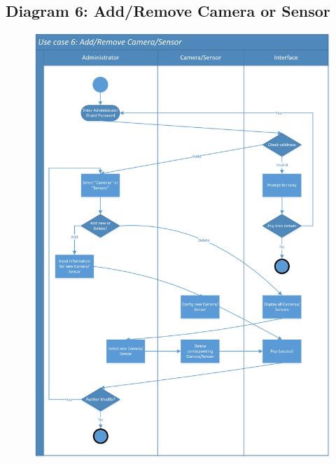 \documentclass[twoside,11pt]{article}
\begin{document}
\subsection{Diagram 6: Add/Remove Camera or Sensor}
\begin{figure}[H]
    \centering
    \includegraphics[width=0.9\columnwidth]{SwimLaneDiagram/Usecase_6.jpg}
\end{figure}
\newpage
\end{document}

